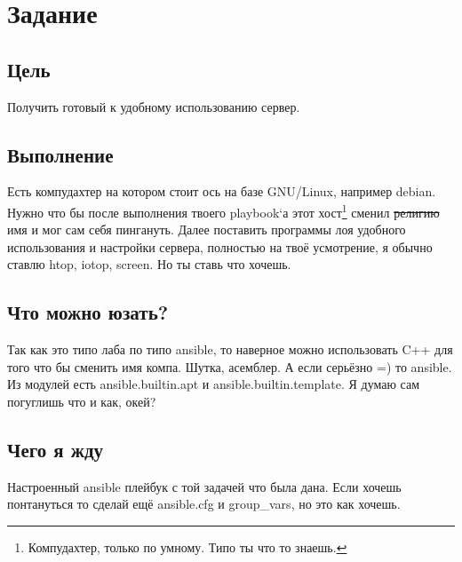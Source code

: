         \section{Задание}
            \subsection{Цель}
                Получить готовый к удобному использованию сервер.

            \subsection{Выполнение}
                Есть компудахтер на котором стоит ось на базе GNU/Linux, например debian. Нужно что бы после выполнения твоего playbook`а этот хост\footnote{Компудахтер, только по умному. Типо ты что то знаешь.} сменил \sout{религию} имя и мог сам себя пингануть. Далее поставить программы лоя удобного использования и настройки сервера, полностью на твоё усмотрение, я обычно ставлю htop, iotop, screen. Но ты ставь что хочешь.

            \pagebreak[4]\subsection{Что можно юзать?}
                Так как это типо лаба по типо ansible, то наверное можно использовать C++ для того что бы сменить имя компа. Шутка, асемблер. А если серьёзно =) то ansible. Из модулей есть ansible.builtin.apt и ansible.builtin.template. Я думаю сам погуглишь что и как, окей?

            \subsection{Чего я жду}
                Настроенный ansible плейбук с той задачей что была дана. Если хочешь понтануться то сделай ещё ansible.cfg и group\_vars, но это как хочешь.

